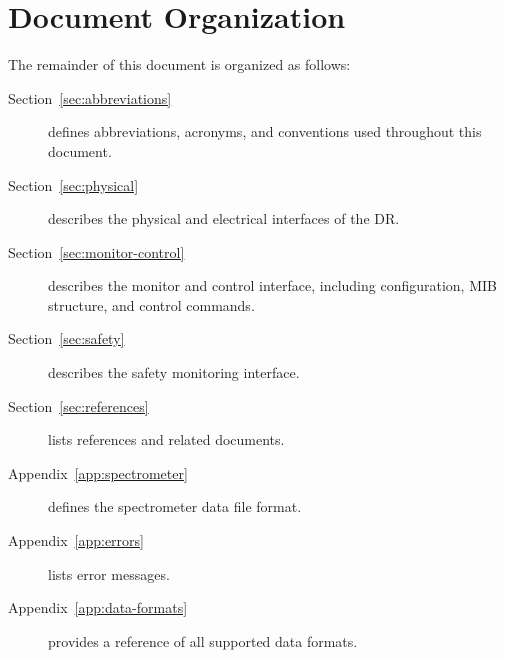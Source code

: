 \section{Document Organization}

The remainder of this document is organized as follows:

\begin{description}
    \item[Section~\ref{sec:abbreviations}] defines abbreviations, acronyms, and
        conventions used throughout this document.
    \item[Section~\ref{sec:physical}] describes the physical and electrical
        interfaces of the DR.
    \item[Section~\ref{sec:monitor-control}] describes the monitor and control
        interface, including configuration, MIB structure, and control commands.
    \item[Section~\ref{sec:safety}] describes the safety monitoring interface.
    \item[Section~\ref{sec:references}] lists references and related documents.
    \item[Appendix~\ref{app:spectrometer}] defines the spectrometer data file
        format.
    \item[Appendix~\ref{app:errors}] lists error messages.
    \item[Appendix~\ref{app:data-formats}] provides a reference of all supported
        data formats.
\end{description}
